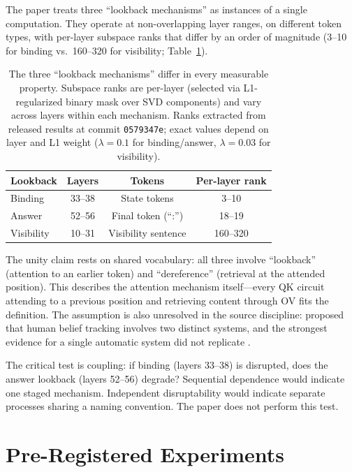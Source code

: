 \documentclass{article}
\begin{document}
The paper treats three ``lookback mechanisms'' as instances of a single computation. They operate at non-overlapping layer ranges, on different token types, with per-layer subspace ranks that differ by an order of magnitude (3--10 for binding vs.\ 160--320 for visibility; Table~\ref{tab:unity}).

\begin{table}[t]
\centering
\caption{The three ``lookback mechanisms'' differ in every measurable property. Subspace ranks are per-layer (selected via L1-regularized binary mask over SVD components) and vary across layers within each mechanism. Ranks extracted from released results at commit \texttt{0579347e}; exact values depend on layer and L1 weight ($\lambda = 0.1$ for binding/answer, $\lambda = 0.03$ for visibility).}
\label{tab:unity}
\begin{tabular}{lccc}
\toprule
Lookback & Layers & Tokens & Per-layer rank \\
\midrule
Binding & 33--38 & State tokens & 3--10 \\
Answer & 52--56 & Final token (``:'') & 18--19 \\
Visibility & 10--31 & Visibility sentence & 160--320 \\
\bottomrule
\end{tabular}
\end{table}

The unity claim rests on shared vocabulary: all three involve ``lookback'' (attention to an earlier token) and ``dereference'' (retrieval at the attended position). This describes the attention mechanism itself---every QK circuit attending to a previous position and retrieving content through OV fits the definition. The assumption is also unresolved in the source discipline: \citet{apperly2009humans} proposed that human belief tracking involves two distinct systems, and the strongest evidence for a single automatic system \citep{kovacs2010social} did not replicate \citep{phillips2015second}.

The critical test is coupling: if binding (layers 33--38) is disrupted, does the answer lookback (layers 52--56) degrade? Sequential dependence would indicate one staged mechanism. Independent disruptability would indicate separate processes sharing a naming convention. The paper does not perform this test.


\section{Pre-Registered Experiments}
\label{sec:experiments}
\end{document}
